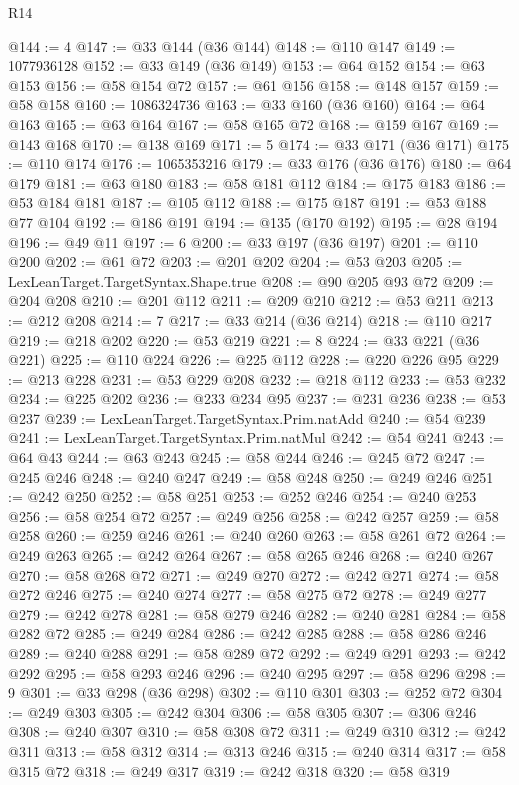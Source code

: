 \begin{lexlean}{R14}
\begin{coremodule}
@144 := 4
@147 := @33 @144 (@36 @144)
@148 := @110 @147
@149 := 1077936128
@152 := @33 @149 (@36 @149)
@153 := @64 @152
@154 := @63 @153
@156 := @58 @154 @72
@157 := @61 @156
@158 := @148 @157
@159 := @58 @158
@160 := 1086324736
@163 := @33 @160 (@36 @160)
@164 := @64 @163
@165 := @63 @164
@167 := @58 @165 @72
@168 := @159 @167
@169 := @143 @168
@170 := @138 @169
@171 := 5
@174 := @33 @171 (@36 @171)
@175 := @110 @174
@176 := 1065353216
@179 := @33 @176 (@36 @176)
@180 := @64 @179
@181 := @63 @180
@183 := @58 @181 @112
@184 := @175 @183
@186 := @53 @184 @181
@187 := @105 @112
@188 := @175 @187
@191 := @53 @188 @77 @104
@192 := @186 @191
@194 := @135 (@170 @192)
@195 := @28 @194
@196 := @49 @11
@197 := 6
@200 := @33 @197 (@36 @197)
@201 := @110 @200
@202 := @61 @72
@203 := @201 @202
@204 := @53 @203
@205 := LexLeanTarget.TargetSyntax.Shape.true
@208 := @90 @205 @93 @72
@209 := @204 @208
@210 := @201 @112
@211 := @209 @210
@212 := @53 @211
@213 := @212 @208
@214 := 7
@217 := @33 @214 (@36 @214)
@218 := @110 @217
@219 := @218 @202
@220 := @53 @219
@221 := 8
@224 := @33 @221 (@36 @221)
@225 := @110 @224
@226 := @225 @112
@228 := @220 @226 @95
@229 := @213 @228
@231 := @53 @229 @208
@232 := @218 @112
@233 := @53 @232
@234 := @225 @202
@236 := @233 @234 @95
@237 := @231 @236
@238 := @53 @237
@239 := LexLeanTarget.TargetSyntax.Prim.natAdd
@240 := @54 @239
@241 := LexLeanTarget.TargetSyntax.Prim.natMul
@242 := @54 @241
@243 := @64 @43
@244 := @63 @243
@245 := @58 @244
@246 := @245 @72
@247 := @245 @246
@248 := @240 @247
@249 := @58 @248
@250 := @249 @246
@251 := @242 @250
@252 := @58 @251
@253 := @252 @246
@254 := @240 @253
@256 := @58 @254 @72
@257 := @249 @256
@258 := @242 @257
@259 := @58 @258
@260 := @259 @246
@261 := @240 @260
@263 := @58 @261 @72
@264 := @249 @263
@265 := @242 @264
@267 := @58 @265 @246
@268 := @240 @267
@270 := @58 @268 @72
@271 := @249 @270
@272 := @242 @271
@274 := @58 @272 @246
@275 := @240 @274
@277 := @58 @275 @72
@278 := @249 @277
@279 := @242 @278
@281 := @58 @279 @246
@282 := @240 @281
@284 := @58 @282 @72
@285 := @249 @284
@286 := @242 @285
@288 := @58 @286 @246
@289 := @240 @288
@291 := @58 @289 @72
@292 := @249 @291
@293 := @242 @292
@295 := @58 @293 @246
@296 := @240 @295
@297 := @58 @296
@298 := 9
@301 := @33 @298 (@36 @298)
@302 := @110 @301
@303 := @252 @72
@304 := @249 @303
@305 := @242 @304
@306 := @58 @305
@307 := @306 @246
@308 := @240 @307
@310 := @58 @308 @72
@311 := @249 @310
@312 := @242 @311
@313 := @58 @312
@314 := @313 @246
@315 := @240 @314
@317 := @58 @315 @72
@318 := @249 @317
@319 := @242 @318
@320 := @58 @319

\end{coremodule}
\end{lexlean}
